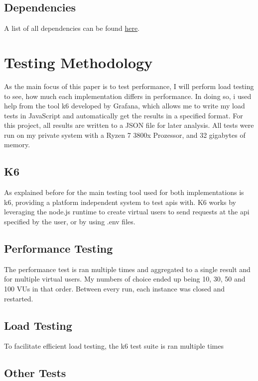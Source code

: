 \documentclass[a4paper,12pt]{article}
\begin{document}
	\subsection{Dependencies}
	A list of all dependencies can be found \href{https://github.com/casqan/actix-eval-mono}{here}.

	\section{Testing Methodology}
	\label{sec:testing_methodology}
	As the main focus of this paper is to test performance, I will perform load testing to see,
	how much each implementation differs in performance. In doing so, i used help from the tool
	k6 developed by Grafana, which allows me to write my load tests in JavaScript and automatically
	get the results in a specified format. For this project, all results are written to a JSON file
	for later analysis. All tests were run on my private system with a Ryzen 7 3800x Prozessor, and
	32 gigabytes of memory.

	\subsection{K6}
	\label{subsec:k6}
	As explained before for the main testing tool used for both implementations is k6, providing
	a platform independent system to test apis with. K6 works by leveraging the node.js runtime
	to create virtual users to send requests at the api specified by the user, or by using .env
	files.
	
	\subsection{Performance Testing}
	\label{subsec:performance_testing}
	The performance test is ran multiple times and aggregated to a single result and for multiple 
	virtual users. My numbers of choice ended up being 10, 30, 50 and 100 VUs in that order.
	Between every run, each instance was closed and restarted.

	\subsection{Load Testing}
	\label{subsec:load_testing}
	To facilitate efficient load testing, the k6 test suite is ran multiple times

	\subsection{Other Tests}
	\label{subsec:other_tests}
\end{document}

